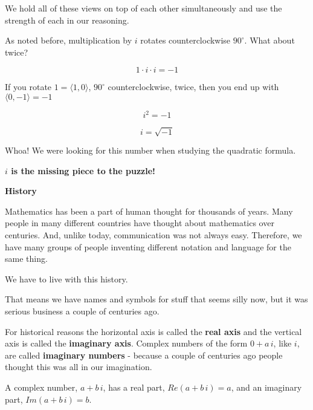 \documentclass{ximera}
\begin{document}
We hold all of these views on top of each other simultaneously and use the strength of each in our reasoning.





As noted before, multiplication by $i$ rotates counterclockwise $90^{\circ}$. What about twice?


\[  1 \cdot i \cdot i = -1    \]



If you rotate $1 = \langle 1, 0 \rangle$, $90^{\circ}$ counterclockwise, twice, then  you end up with $\langle 0,-1 \rangle = -1$





\[   i^2 = -1\]



\[   i = \sqrt{-1}   \]




Whoa!  We were looking for this number when studying the quadratic formula.  


\begin{center}
\textbf{\textcolor{red!80!black}{$i$ is the missing piece to the puzzle!}}
\end{center}








\textbf{\textcolor{purple!50!blue!90!black}{History}}


Mathematics has been a part of human thought for thousands of years.  Many people in many different countries have thought about mathematics over centuries.  And, unlike today, communication was not always easy.  Therefore, we have many groups of people inventing different notation and language for the same thing.  

We have to live with this history.

That means we have names and symbols for stuff that seems silly now, but it was serious business a couple of centuries ago.

For historical reasons the horizontal axis is called the \textbf{real axis} and the vertical axis is called the \textbf{imaginary axis}.  Complex numbers of the form $0 + a \, i$, like $i$, are called \textbf{imaginary numbers} - because a couple of centuries ago people thought this was all in our imagination.


A complex number, $a + b \, i$, has a real part, $Re(a + b \, i)= a$, and an imaginary part, $Im( a + b \, i)= b$.
\end{document}
